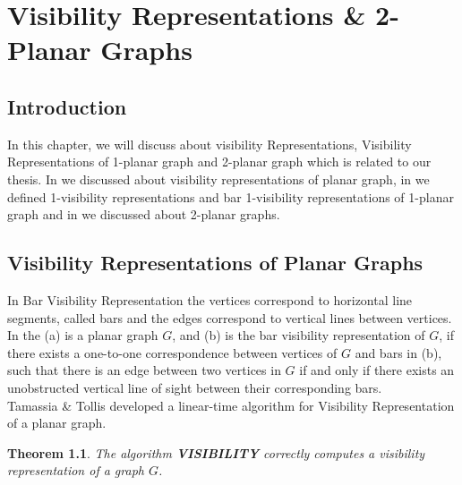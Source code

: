 \chapter{Visibility Representations \& 2-Planar Graphs}\label{visibility}
\newtheorem{theorem}{Theorem}
\newtheorem{lemma}{Lemma}
\section{Introduction}

In this chapter, we will discuss about visibility Representations, Visibility Representations of 1-planar graph and 2-planar graph which is related to our thesis. In  we discussed about visibility representations of planar graph, in  we defined 1-visibility representations and bar 1-visibility representations of 1-planar graph and in  we discussed about 2-planar graphs.






\section{Visibility Representations of Planar Graphs}
\label{sec:vr}

In Bar Visibility Representation \cite{R} the vertices correspond to horizontal line segments, called bars and the edges correspond to vertical lines between vertices.
In the  (a) is a planar graph $G$, and (b) is the bar visibility representation of $G$, if there exists a one-to-one correspondence between vertices of $G$ and bars in (b), such that there is an edge between two vertices in $G$ if and only if there exists an unobstructed vertical line of sight between their corresponding bars.
\\
Tamassia \& Tollis \cite{R} developed a linear-time algorithm for Visibility Representation of a planar graph.


\begin{theorem} The algorithm \textbf{VISIBILITY} correctly computes a visibility
representation of a graph $G$.
\end{theorem}


